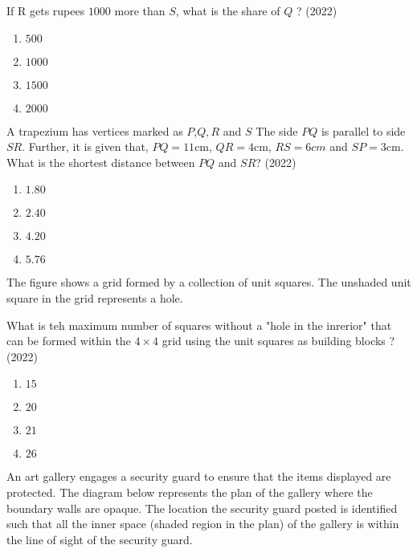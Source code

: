        If R gets rupees $1000$ more than $S$, what is the share of $Q$ ?
       \hfill{(2022)}
            \begin{enumerate}
                  \item $500$
                  \item $1000$
                  \item $1500$
                  \item $2000$
            \end{enumerate}
       \item A trapezium has vertices marked as $P$,$Q, R$ and $S$ The side $PQ$ is parallel to side $SR$. Further, it is given that, $PQ=11$cm, $QR=4$cm, $RS= 6cm$ and $SP=3$cm. What is the shortest distance between $PQ$ and $SR$?
       \hfill{(2022)}
            \begin{enumerate}
                \item $1.80$
                \item $2.40$
                \item $4.20$
                \item $5.76$
            \end{enumerate}
 	\item The figure shows a grid formed by a collection of unit squares. The unshaded unit square in the grid represents a hole.
		 
	What is teh maximum number of squares without a "hole in the inrerior" that can be formed within the $4 \times 4$ grid using the unit squares as building blocks ?
	\hfill{(2022)}
             \begin{enumerate}
                   \item $15$
                   \item $20$
                   \item $21$
                   \item $26$
             \end{enumerate}
       \item An art gallery engages a security guard to ensure that the items displayed are protected. The diagram below represents the plan of the gallery where the boundary walls are opaque. The location the security guard posted is identified such that all the inner space (shaded region in the plan) of the gallery is within the line of sight of the security guard.
 

